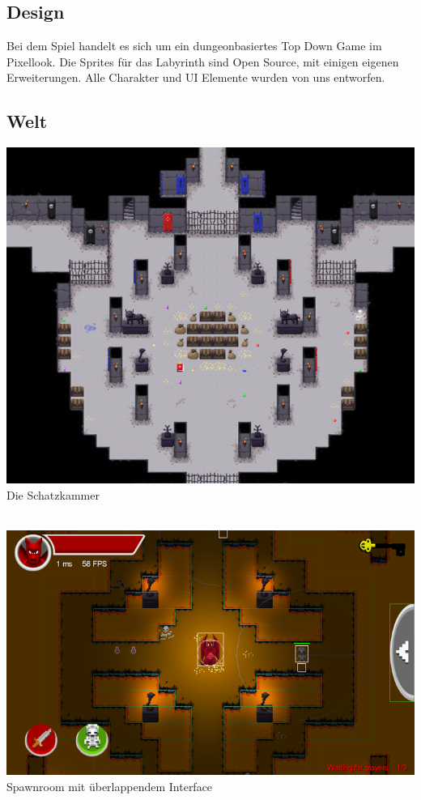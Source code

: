 \documentclass[10pt,a4paper,notitlepage]{scrreprt}
\begin{document}
\begin{flushleft}
\chapter{Design}
Bei dem Spiel handelt es sich um ein dungeonbasiertes Top Down Game im Pixellook. Die Sprites für das Labyrinth sind Open Source, mit einigen eigenen Erweiterungen. Alle Charakter und UI Elemente wurden von uns entworfen.\\

\section{Welt}
	\begin{center}
			\includegraphics[scale=0.8]{maze.png}\\
		Die Schatzkammer\\\

		\includegraphics[scale=0.8]{mazewithui.png}\\
		Spawnroom mit überlappendem Interface\\
	\end{center}


\end{flushleft}
\end{document}
